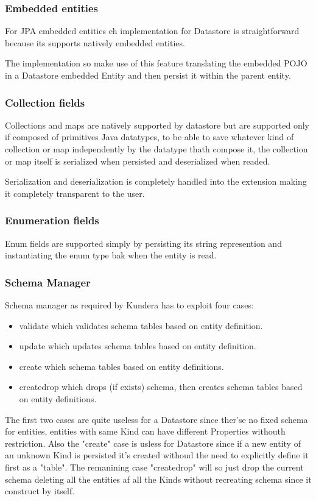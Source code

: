\subsubsection{Embedded entities}
For JPA embedded entities eh implementation for Datastore is straightforward because its supports natively embedded entities.

The implementation so make use of this feature translating the embedded POJO in a Datastore embedded Entity and then persist it within the parent entity.

\subsubsection{Collection fields}
Collections and maps are natively supported by datastore but are supported only if composed of primitives Java datatypes, to be able to save whatever kind of collection or map independently by the datatype thath compose it, the collection or map itself is serialized when persisted and deserialized when readed.

Serialization and deserialization is completely handled into the extension making it completely transparent to the user.

\subsubsection{Enumeration fields}
Enum fields are supported simply by persisting its string represention and instantiating the enum type bak when the entity is read.

\subsubsection{Schema Manager}
Schema manager as required by Kundera has to exploit four cases:
\begin{itemize}
\item validate which validates schema tables based on entity definition.
\item update which updates schema tables based on entity definition.
\item create which schema tables based on entity definitions.
\item create\textunderscore drop which drops (if exists) schema, then creates schema tables based on entity definitions.
\end{itemize}
The first two cases are quite useless for a Datastore since ther'se no fixed schema for entities, entities with same Kind can have different Properties withouth restriction.
Also the "create" case is usless for Datastore since if a new entity of an unknown Kind is persisted it's created withoud the need to explicitly define it first as a "table".
The remanining case "create\textunderscore drop" will so just drop the current schema deleting all the entities af all the Kinds without recreating schema since it construct by itself.

